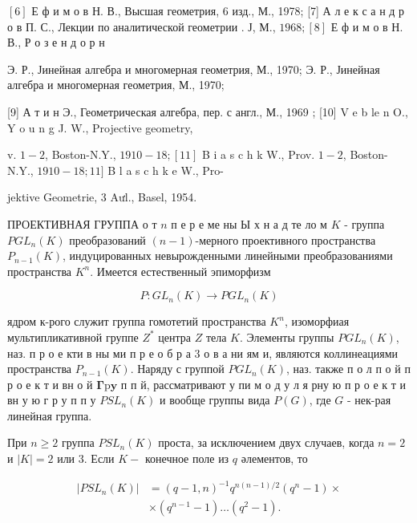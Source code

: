\documentclass[10pt]{article}
\begin{document}
$[6]$ Е ф и м о в Н. В., Высшая геометрия, 6 изд., М., 1978; [7] А л е к с а н д р о в П. С., Лекции по аналитической геометрии . Ј, М., $1968 ;[8]$ Е ф и м о в Н. В., Р о з е н д о р н

Э. Р., Јинейная алгебра и многомерная геометрия, М., 1970; Э. Р., Јинейная алгебра и многомерная геометрия, М., 1970;

[9] А т и н Э., Геометрическая алгебра, пер. с англ., М., 1969 ; [10] V e b le n O., Y o u n g J. W., Projective geometry,

v. $1-2$, Boston-N.Y., $1910-18 ;[11]$ B i a s c h k W., Prov. $1-2$, Boston-N.Y., $1910-18 ; 11]$ B l a s c h k e W., Pro-

jektive Geometrie, 3 Aưl., Basel, 1954.



ПРОЕКТИВНАЯ ГРУППА о т $n$ п е р е ме ны Ы х н а д те ло м $K$ - группа $P G L_{n}(K)$ преобразований $(n-1)$-мерного проективного пространства $P_{n-1}(K)$, индуцированных невырожденными линейными преобразованиями пространства $K^{n}$. Имеется естественный эпиморфизм



\[

P: G L_{n}(K) \longrightarrow P G L_{n}(K)

\]



ядром к-рого служит группа гомотетий пространства $K^{n}$, изоморфиая мультипликативной группе $Z^{*}$ центра $Z$ тела $K$. Элементы группы $P G L_{n}(K)$, наз. п р о е кти в ны ми п р е о б р а 3 о в а ни ям и, являются коллинеациями пространства $P_{n-1}(K)$. Наряду с группой $P G L_{n}(K)$, наз. также п о л п о й п р о е к т и вн о й $\boldsymbol{\Gamma} \mathrm{p} \mathbf{y}$ п п й, рассматривают у пи м о д у л я рну ю п р о е к т и вн у ю г р у п п у $P S L_{n}(K)$ и вообще группы вида $P(G)$, где $G$ - нек-рая линейная группа.



При $n \geqslant 2$ группа $P S L_{n}(K)$ проста, за исключением двух случаев, когда $n=2$ и $|K|=2$ или 3. Если $K-$ конечное поле из $q$ әлементов, то



\[

\begin{aligned}

\left|P S L_{n}(K)\right| & =(q-1, n)^{-1} q^{n(n-1) / 2}\left(q^{n}-1\right) \times \\

& \times\left(q^{n-1}-1\right) \ldots\left(q^{2}-1\right) .

\end{aligned}

\]
\end{document}
